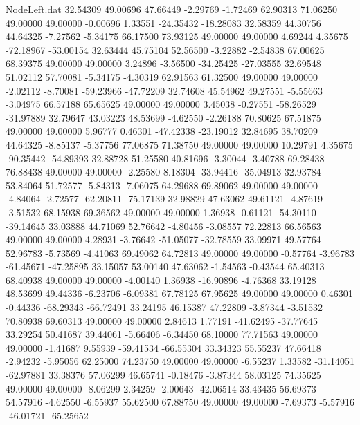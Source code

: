 \begin{filecontents}{NodeLeft.dat}
  32.54309   49.00696   47.66449    -2.29769   -1.72469   62.90313   71.06250   49.00000   49.00000   -0.00696    1.33551  -24.35432  -18.28083
  32.58359   44.30756   44.64325    -7.27562   -5.34175   66.17500   73.93125   49.00000   49.00000    4.69244    4.35675  -72.18967  -53.00154
  32.63444   45.75104   52.56500    -3.22882   -2.54838   67.00625   68.39375   49.00000   49.00000    3.24896   -3.56500  -34.25425  -27.03555
  32.69548   51.02112   57.70081    -5.34175   -4.30319   62.91563   61.32500   49.00000   49.00000   -2.02112   -8.70081  -59.23966  -47.72209
  32.74608   45.54962   49.27551    -5.55663   -3.04975   66.57188   65.65625   49.00000   49.00000    3.45038   -0.27551  -58.26529  -31.97889
  32.79647   43.03223   48.53699    -4.62550   -2.26188   70.80625   67.51875   49.00000   49.00000    5.96777    0.46301  -47.42338  -23.19012
  32.84695   38.70209   44.64325    -8.85137   -5.37756   77.06875   71.38750   49.00000   49.00000   10.29791    4.35675  -90.35442  -54.89393
  32.88728   51.25580   40.81696    -3.30044   -3.40788   69.28438   76.88438   49.00000   49.00000   -2.25580    8.18304  -33.94416  -35.04913
  32.93784   53.84064   51.72577    -5.84313   -7.06075   64.29688   69.89062   49.00000   49.00000   -4.84064   -2.72577  -62.20811  -75.17139
  32.98829   47.63062   49.61121    -4.87619   -3.51532   68.15938   69.36562   49.00000   49.00000    1.36938   -0.61121  -54.30110  -39.14645
  33.03888   44.71069   52.76642    -4.80456   -3.08557   72.22813   66.56563   49.00000   49.00000    4.28931   -3.76642  -51.05077  -32.78559
  33.09971   49.57764   52.96783    -5.73569   -4.41063   69.49062   64.72813   49.00000   49.00000   -0.57764   -3.96783  -61.45671  -47.25895
  33.15057   53.00140   47.63062    -1.54563   -0.43544   65.40313   68.40938   49.00000   49.00000   -4.00140    1.36938  -16.90896   -4.76368
  33.19128   48.53699   49.44336    -6.23706   -6.09381   67.78125   67.95625   49.00000   49.00000    0.46301   -0.44336  -68.29343  -66.72491
  33.24195   46.15387   47.22809    -3.87344   -3.51532   70.80938   69.60313   49.00000   49.00000    2.84613    1.77191  -41.62495  -37.77645
  33.29254   50.41687   39.44061    -5.66406   -6.34450   68.10000   77.71563   49.00000   49.00000   -1.41687    9.55939  -59.41534  -66.55304
  33.34323   55.55237   47.66418    -2.94232   -5.95056   62.25000   74.23750   49.00000   49.00000   -6.55237    1.33582  -31.14051  -62.97881
  33.38376   57.06299   46.65741    -0.18476   -3.87344   58.03125   74.35625   49.00000   49.00000   -8.06299    2.34259   -2.00643  -42.06514
  33.43435   56.69373   54.57916    -4.62550   -6.55937   55.62500   67.88750   49.00000   49.00000   -7.69373   -5.57916  -46.01721  -65.25652

\end{filecontents}
